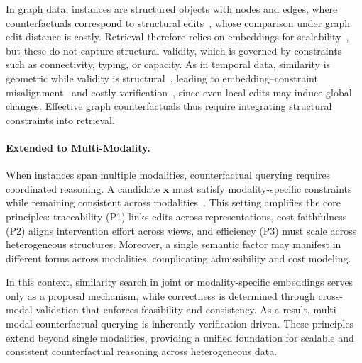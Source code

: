 In graph data, instances are structured objects with nodes and edges, where counterfactuals correspond to structural edits~\cite{gao2010survey}, whose comparison under graph edit distance is costly. Retrieval therefore relies on embeddings for scalability~\cite{kipf2016semi}, but these do not capture structural validity, which is governed by constraints such as connectivity, typing, or capacity. As in temporal data, similarity is geometric while validity is structural~\cite{kazemi2019time2vec}, leading to embedding--constraint misalignment~\cite{armgaan2024graphtrail} and costly verification~\cite{xu2018powerful}, since even local edits may induce global changes. Effective graph counterfactuals thus require integrating structural constraints into retrieval.

\paragraph{Extended to Multi-Modality.}
When instances span multiple modalities, counterfactual querying requires coordinated reasoning. A candidate $\mathbf{x}$ must satisfy modality-specific constraints while remaining consistent across modalities~\cite{chen2019cross}. This setting amplifies the core principles: traceability (P1) links edits across representations, cost faithfulness (P2) aligns intervention effort across views, and efficiency (P3) must scale across heterogeneous structures. Moreover, a single semantic factor may manifest in different forms across modalities, complicating admissibility and cost modeling.

In this context, similarity search in joint or modality-specific embeddings serves only as a proposal mechanism, while correctness is determined through cross-modal validation that enforces feasibility and consistency. As a result, multi-modal counterfactual querying is inherently verification-driven. These principles extend beyond single modalities, providing a unified foundation for scalable and consistent counterfactual reasoning across heterogeneous data.

